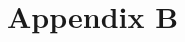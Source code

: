 \chapter{Appendix B}
\label{app:externalFunctions}

\setlength{\columnsep}{6em}
\begin{multicols}{4}
\scriptsize{

}
\end{multicols}